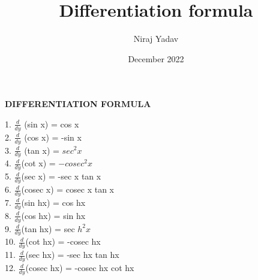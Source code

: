 \documentclass[20pt]{article}
\title{Differentiation formula}
\author{Niraj Yadav}
\date{December 2022}
\begin{document}
\maketitle

\begin{center}



\textbf{DIFFERENTIATION FORMULA}\\
\end{center}

1. $\frac{d}{dy}$ (sin x) = cos x \\

2. $\frac{d}{dy}$ (cos x) = -sin x\\

3. $\frac{d}{dy}$ (tan x) = $sec^2 x$\\

4. $\frac{d}{dy}$(cot x) = $-cosec^2 x$\\

5. $\frac{d}{dy}$(sec x) = -sec x tan x\\

6. $\frac{d}{dy}$(cosec x) = cosec x tan x\\

7. $\frac{d}{dy}$(sin hx) = cos hx\\

8. $\frac{d}{dy}$(cos hx) = sin hx\\

9. $\frac{d}{dy}$(tan hx) = sec $h^2x$\\

10. $\frac{d}{dy}$(cot hx) = -cosec hx\\

11. $\frac{d}{dy}$(sec hx) = -sec hx tan hx\\

12. $\frac{d}{dy}$(cosec hx) = -cosec hx cot hx
\end{document}
